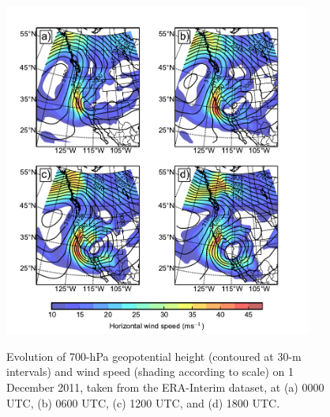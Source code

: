 \documentclass[pdftex,12pt]{article}
\begin{document}
\begin{figure}[t]
\centering
\includegraphics[width=0.9\textwidth]{dec1_Z_wind_ERA.pdf}\\
\caption{Evolution of 700-hPa geopotential height (contoured at 30-m intervals) and wind speed (shading according to scale) on 1 December 2011, taken from the ERA-Interim dataset, at (a) 0000 UTC, (b) 0600 UTC, (c) 1200 UTC, and (d) 1800 UTC.}
\label{fig:geopot4panel}
\end{figure}

\end{document}
